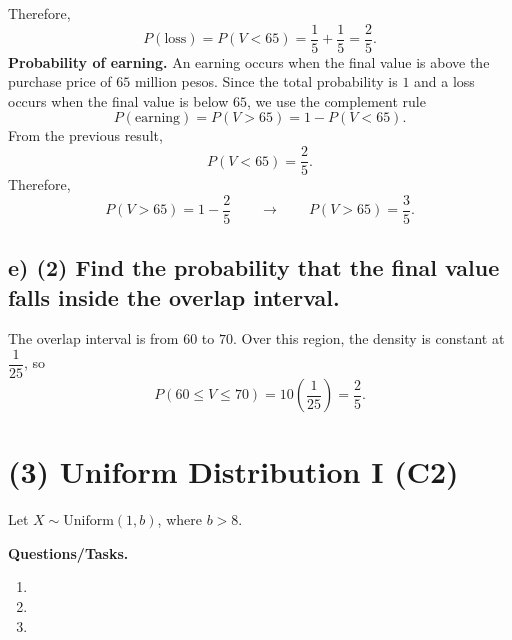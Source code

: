 Therefore,
\[
P(\text{loss})=P(V<65)=\frac{1}{5}+\frac{1}{5}=\frac{2}{5}.
\]
\textbf{Probability of earning.}
An earning occurs when the final value is above the purchase price of $65$ million pesos. Since the total probability is $1$ and a loss occurs when the final value is below $65$, we use the complement rule
\[
P(\text{earning})=P(V>65)=1-P(V<65).
\]
From the previous result,
\[
P(V<65)=\frac{2}{5}.
\]
Therefore,
\[
P(V>65)=1-\frac{2}{5}\qquad \longrightarrow \qquad P(V>65)=\frac{3}{5}.
\]


\subsection*{e) \textbf{(2)} Find the probability that the final value falls inside the overlap interval.}
\label{subsec:two-scenario-inventory-investment-c2-e}
The overlap interval is from $60$ to $70$. Over this region, the density is constant at $\dfrac{1}{25}$, so
\[
P(60\le V\le 70)=10\left(\frac{1}{25}\right)=\frac{2}{5}.
\]


\section{(3) Uniform Distribution I (C2)}
\label{sec:uniform-distribution-i-c2}

Let $X\sim \text{Uniform}(1,b)$, where $b>8$.

\textbf{Questions/Tasks.}
\begin{enumerate}[label=\textbf{\alph*)}]
	\item {}
	\item {}
	\item {}
\end{enumerate}


